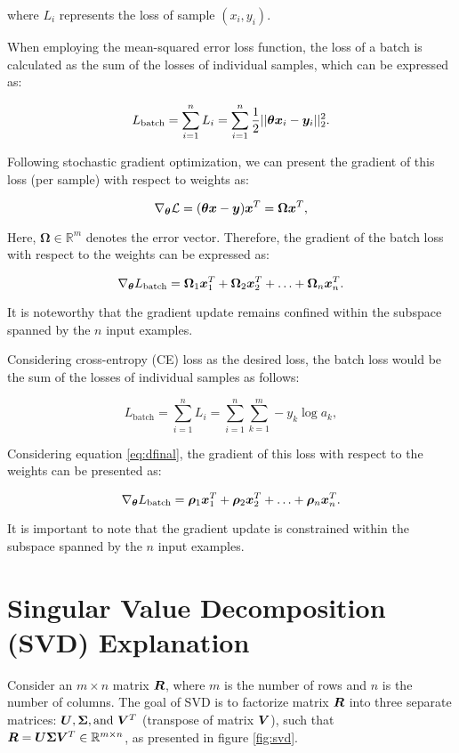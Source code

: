 \documentclass{article}
\begin{document}
where $L_i$ represents the loss of sample $(x_i,y_i)$.

When employing the mean-squared error loss function, the loss of a batch is calculated as the sum of the losses of individual samples, which can be expressed as:

\begin{equation}\label{eqa1ms}
L_{\text{batch}} = \sum_{i=1}^{n} L_i = \sum_{i=1}^{n} \frac{1}{2} || {\bm{\theta}} {\bm{x}}_i - {\bm{y}}_i ||_{2}^2.
\end{equation}

Following stochastic gradient optimization, we can present the gradient of this loss (per sample) with respect to weights as:

\begin{equation}\label{eq2-ms}
\nabla_{{\bm{\theta}}} \mathcal{L} = ({\bm{\theta}} {\bm{x}} -{\bm{y}}) {\bm{x}}^T = \bm{\Omega} {\bm{x}}^T,
\end{equation}

Here, $\bm{\Omega} \in \mathbb{R}^m$ denotes the error vector. Therefore, the gradient of the batch loss with respect to the weights can be expressed as:

\begin{equation}\label{eqa2ms}
\nabla_{{\bm{\theta}}} L_{\text{batch}} = \bm{\Omega}_1 {\bm{x}}_1^T + \bm{\Omega}_2 {\bm{x}}_2^T + \ldots + \bm{\Omega}_n {\bm{x}}_n^T.
\end{equation}

It is noteworthy that the gradient update remains confined within the subspace spanned by the $n$ input examples.

Considering cross-entropy (CE) loss as the desired loss, the batch loss would be the sum of the losses of individual samples as follows:

\begin{equation}\label{eqa1ce}
L_{\text{batch}} = \sum_{i=1}^{n} L_i = \sum_{i=1}^{n} \sum_{k=1}^m -y_k \log a_k,
\end{equation}

Considering equation \ref{eq:dfinal}, the gradient of this loss with respect to the weights can be presented as:

\begin{equation}\label{eqa2ce}
\nabla_{{\bm{\theta}}} L_{\text{batch}} = \bm{\rho}_1 {\bm{x}}_1^T + \bm{\rho}_2 {\bm{x}}_2^T + \ldots + \bm{\rho}_n {\bm{x}}_n^T.
\end{equation}

It is important to note that the gradient update is constrained within the subspace spanned by the $n$ input examples.
\section{Singular Value Decomposition (SVD) Explanation}
\label{app:svdExplanation}
Consider an $m \times n$ matrix ${\bm{R}}$, where $m$ is the number of rows and $n$ is the number of columns. The goal of SVD is to factorize matrix ${\bm{R}}$ into three separate matrices: ${\bm{U}}, {\bm{\Sigma}}, \text{and } {\bm{V}}^T$ (transpose of matrix ${\bm{V}}$), such that ${\bm{R}} = {\bm{U}}{\bm{\Sigma}}{\bm{V}}^T \in \mathbb{R}^{m\times n}$, as presented in figure \ref{fig:svd}.
\end{document}
